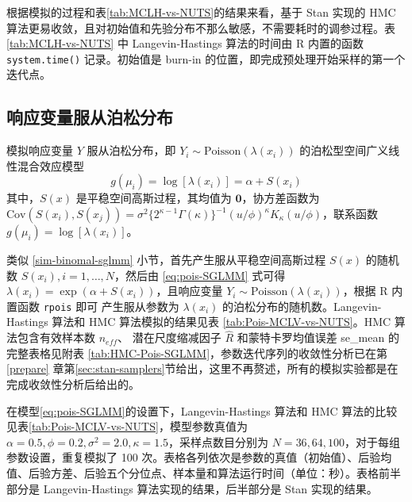 \documentclass[12pt,a4paper,UTF8,twoside]{book}
\theoremstyle{definition}
\theoremstyle{definition}
\theoremstyle{definition}
\theoremstyle{remark}
\begin{document}
根据模拟的过程和表\ref{tab:MCLH-vs-NUTS}的结果来看，基于 Stan 实现的 HMC
算法更易收敛，且对初始值和先验分布不那么敏感，不需要耗时的调参过程。表
\ref{tab:MCLH-vs-NUTS} 中 Langevin-Hastings 算法的时间由 R 内置的函数
\texttt{system.time()} 记录。初始值是 burn-in
的位置，即完成预处理开始采样的第一个迭代点。

\hypertarget{possion-sglmm}{%
\subsection{响应变量服从泊松分布}\label{possion-sglmm}}

模拟响应变量 \(Y\) 服从泊松分布，即
\(Y_i \sim \mathrm{Poisson}(\lambda(x_{i}))\)
的泊松型空间广义线性混合效应模型 \begin{equation}
g(\mu_i) = \log[\lambda(x_i)] = \alpha + S(x_i) \label{eq:pois-SGLMM}
\end{equation} \noindent 其中，\(S(x)\) 是平稳空间高斯过程，其均值为
\(\mathbf{0}\)，协方差函数为
\(\mathrm{Cov}(S(x_i),S(x_j)) = \sigma^2 \big\{2^{\kappa-1}\Gamma(\kappa)\big\}^{-1}(u/\phi)^{\kappa}K_{\kappa}(u/\phi)\)，联系函数
\(g(\mu_i) = \log[\lambda(x_{i})]\)。

类似 \ref{sim-binomal-sglmm} 小节，首先产生服从平稳空间高斯过程 \(S(x)\)
的随机数 \(S(x_i),i=1,\ldots,N\)，然后由 \eqref{eq:pois-SGLMM} 式可得
\(\lambda(x_i) = \exp(\alpha + S(x_i))\)，且响应变量
\(Y_i \sim \mathrm{Poisson}(\lambda(x_{i}))\)，根据 R 内置函数
\texttt{rpois} 即可 产生服从参数为 \(\lambda(x_i)\)
的泊松分布的随机数。Langevin-Hastings 算法和 HMC 算法模拟的结果见表
\ref{tab:Pois-MCLV-vs-NUTS}。HMC 算法包含有效样本数 \(n_{eff}\)、
潜在尺度缩减因子 \(\hat{R}\) 和蒙特卡罗均值误差 se\_mean
的完整表格见附表
\ref{tab:HMC-Pois-SGLMM}，参数迭代序列的收敛性分析已在第\ref{prepare}
章第\ref{sec:stan-samplers}节给出，这里不再赘述，所有的模拟实验都是在完成收敛性分析后给出的。

在模型\eqref{eq:pois-SGLMM}的设置下，Langevin-Hastings 算法和 HMC
算法的比较见表\ref{tab:Pois-MCLV-vs-NUTS}，模型参数真值为
\(\alpha = 0.5, \phi = 0.2, \sigma^2 = 2.0, \kappa = 1.5\)，采样点数目分别为
\(N=36,64,100\)，对于每组参数设置，重复模拟了 100
次。表格各列依次是参数的真值（初始值）、后验均值、后验方差、后验五个分位点、样本量和算法运行时间（单位：秒）。表格前半部分是
Langevin-Hastings 算法实现的结果，后半部分是 Stan 实现的结果。
\end{document}
